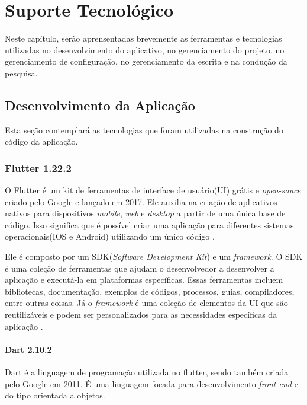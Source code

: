 \chapter[Suporte Tecnológico]{Suporte Tecnológico}

Neste capítulo, serão aprensentadas brevemente as ferramentas e tecnologias 
utilizadas no desenvolvimento do aplicativo, no gerenciamento 
do projeto, no gerenciamento de configuração, no gerenciamento da 
escrita e na condução da pesquisa.

\section{Desenvolvimento da Aplicação}

Esta seção contemplará as tecnologias que foram utilizadas na construção do 
código da aplicação.

\subsection{Flutter 1.22.2}

O Flutter é um kit de ferramentas de interface de usuário(UI) 
grátis e \emph{open-souce} criado pelo Google e lançado em 2017. 
Ele auxilia na criação de aplicativos nativos para dispositivos 
\emph{mobile}, \emph{web} e \emph{desktop} a partir de uma 
única base de código. Isso significa que é possível criar uma 
aplicação para diferentes sistemas operacionais(IOS e Android) 
utilizando um único código \cite{flutter2017}.

Ele é composto por um SDK(\emph{Software Development Kit}) e um
\emph{framework}. O SDK é uma coleção de ferramentas que ajudam
o desenvolvedor a desenvolver a aplicação e executá-la em
plataformas específicas. Essas ferramentas incluem bibliotecas,
documentação, exemplos de códigos, processos, guias,
compiladores, entre outras coisas. Já o \emph{framework} é
uma coleção de elementos da UI que são reutilizáveis e podem
ser personalizados para as necessidades específicas da
aplicação \cite{flutter2017}.

\subsubsection{Dart 2.10.2}

Dart é a linguagem de programação utilizada no flutter, sendo também 
criada pelo Google em 2011. É uma linguagem focada para 
desenvolvimento \emph{front-end} e do tipo orientada a objetos\cite{flutter2017}.

